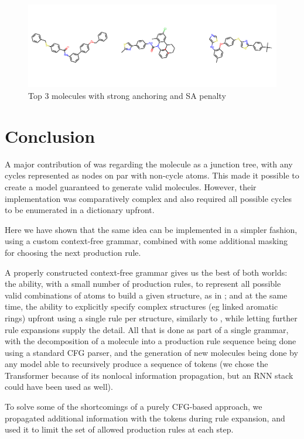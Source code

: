\documentclass[11pt]{article}
\begin{document}
\begin{figure}[ht]
	\centering
	\includegraphics[width=\textwidth]{strong.pdf}
	\caption{Top 3 molecules with strong anchoring and SA penalty}\label{fig:strong}
\end{figure}


\section{Conclusion}
A major contribution of \cite{jin18} was regarding the molecule as a junction tree, with any cycles represented as nodes on par with non-cycle atoms. This made it possible to create a model guaranteed to generate valid molecules. However, their implementation was comparatively complex and also required all possible cycles to be enumerated in a dictionary upfront. 

Here we have shown that the same idea can be implemented in a simpler fashion, using a custom context-free grammar, combined with some additional masking for choosing the next production rule. 

A properly constructed context-free grammar gives us the best of both worlds: the ability, with a small number of production rules, to represent all possible valid combinations of atoms to build a given structure, as in \cite{kusner17}; and at the same time, the ability to explicitly specify complex structures (eg linked aromatic rings) upfront using a single rule per structure, similarly to \cite{jin18}, while letting further rule expansions supply the detail. All that is done as part of a single grammar, with the decomposition of a molecule into a production rule sequence being done using a standard CFG parser, and the generation of new molecules being done by any model able to recursively produce a sequence of tokens (we chose the Transformer because of its nonlocal information propagation, but an RNN stack could have been used as well).

To solve some of the shortcomings of a purely CFG-based approach, we propagated additional information with the tokens during rule expansion, and used it to limit the set of allowed production rules at each step. 
\end{document}
